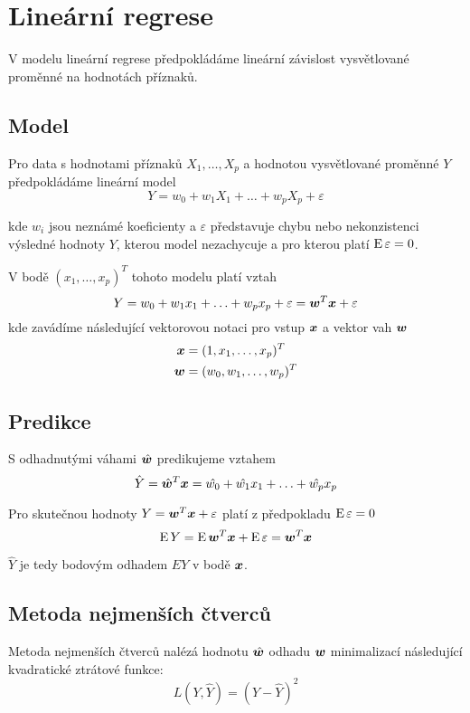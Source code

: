 \section{Lineární regrese}

V modelu lineární regrese předpokládáme lineární závislost vysvětlované proměnné na hodnotách příznaků.

\subsection{Model}

Pro data s hodnotami příznaků $X_1, \ldots, X_p$ a hodnotou vysvětlované proměnné $Y$ předpokládáme lineární model
\begin{equation*}
    Y = w_0 + w_1 X_1 + \ldots + w_p X_p + \varepsilon
\end{equation*}

kde $w_i$ jsou neznámé koeficienty a $\varepsilon$ představuje chybu nebo nekonzistenci výsledné hodnoty $Y$, kterou model nezachycuje a pro kterou platí $\operatorname{E} \varepsilon = 0$.

V bodě $(x_1, \ldots, x_p)^T$ tohoto modelu platí vztah \[ Y = w_0 + w_1 x_1 + \ldots + w_p x_p + \varepsilon = \bm{w}^T \bm{x} + \varepsilon \] kde zavádíme následující vektorovou notaci pro vstup $\bm{x}$ a vektor vah $\bm{w}$
\begin{align*}
    \bm{x}  & = (1, x_1, \ldots, x_p)^T   \\
    \bm{w} & = (w_0, w_1, \ldots, w_p)^T
\end{align*}

\subsection{Predikce}

S odhadnutými váhami $\hat{\bm{w}}$ predikujeme vztahem
\[\hat{Y} = \hat{\bm{w}}^T\bm{x} = \hat{w_0} + \hat{w_1} x_1 + \ldots + \hat{w_p} x_p\]

Pro skutečnou hodnoty $Y = \bm{w}^T \bm{x} + \varepsilon$ platí z předpokladu $\operatorname{E} \varepsilon = 0$ \[\operatorname{E} Y = \operatorname{E} \bm{w}^T \bm{x} + \operatorname{E} \varepsilon = \bm{w}^T \bm{x}\]

$\hat{Y}$ je tedy bodovým odhadem $EY$ v bodě $\bm{x}$.

\subsection{Metoda nejmenších čtverců}

Metoda nejmenších čtverců nalézá hodnotu $\hat{\bm{w}}$ odhadu $\bm{w}$ minimalizací následující kvadratické ztrátové funkce: \[L(Y, \hat{Y}) = (Y - \hat{Y})^2\]

